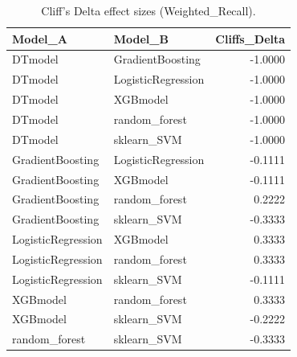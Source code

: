 \begin{table}[t]
\centering
\begin{tabular}{llr}
\toprule
Model_A & Model_B & Cliffs_Delta \\
\midrule
DTmodel & GradientBoosting & -1.0000 \\
DTmodel & LogisticRegression & -1.0000 \\
DTmodel & XGBmodel & -1.0000 \\
DTmodel & random_forest & -1.0000 \\
DTmodel & sklearn_SVM & -1.0000 \\
GradientBoosting & LogisticRegression & -0.1111 \\
GradientBoosting & XGBmodel & -0.1111 \\
GradientBoosting & random_forest & 0.2222 \\
GradientBoosting & sklearn_SVM & -0.3333 \\
LogisticRegression & XGBmodel & 0.3333 \\
LogisticRegression & random_forest & 0.3333 \\
LogisticRegression & sklearn_SVM & -0.1111 \\
XGBmodel & random_forest & 0.3333 \\
XGBmodel & sklearn_SVM & -0.2222 \\
random_forest & sklearn_SVM & -0.3333 \\
\bottomrule
\end{tabular}
\caption{Cliff's Delta effect sizes (Weighted_Recall).}
\label{tab:cliffs_Weighted_Recall}
\end{table}